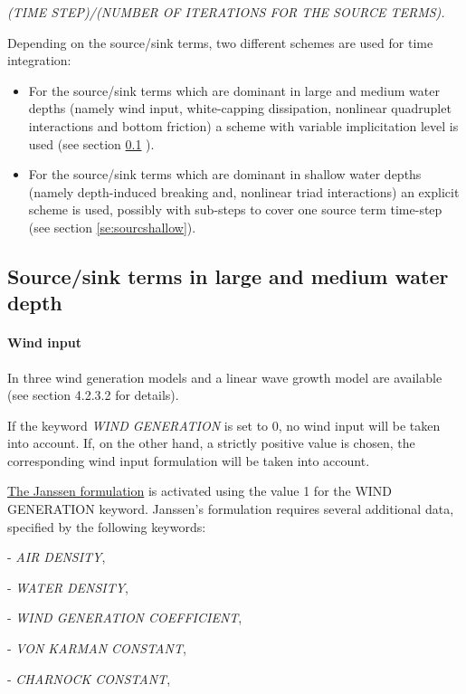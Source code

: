  \textit{(TIME STEP)/(NUMBER OF ITERATIONS FOR THE SOURCE TERMS).}

 Depending on the source/sink terms, two different schemes are used for time integration:

\begin{itemize}
\item  For the source/sink terms which are dominant in large and medium water depths (namely wind input, white-capping dissipation,
  nonlinear quadruplet interactions and bottom friction) a scheme with variable implicitation level is used (see section
  \ref{se:sourclarge}
).

\item  For the source/sink terms which are dominant in shallow water depths (namely depth-induced breaking and, nonlinear triad
  interactions) an explicit scheme is used, possibly with sub-steps to cover one source term time-step (see section
  \ref{se:sourcshallow}).
\end{itemize}


\subsection{ Source/sink terms in large and medium water depth}
\label{se:sourclarge}

\paragraph{ Wind input}

 In \tomawac three wind generation models and a linear wave growth model are available (see section 4.2.3.2 for details).

 If the keyword \textit{WIND GENERATION} is set to 0, no wind input will be taken into account. If, on the other hand, a strictly
 positive value is chosen, the corresponding wind input formulation will be taken into account.

 \underline{ The Janssen formulation} is activated using the value 1 for the WIND GENERATION keyword. Janssen's formulation requires
 several additional data, specified by the following keywords:
 
- \textit{AIR DENSITY},

- \textit{WATER DENSITY},  

- \textit{WIND GENERATION COEFFICIENT}, 

- \textit{VON KARMAN CONSTANT}, 

- \textit{CHARNOCK CONSTANT},   

